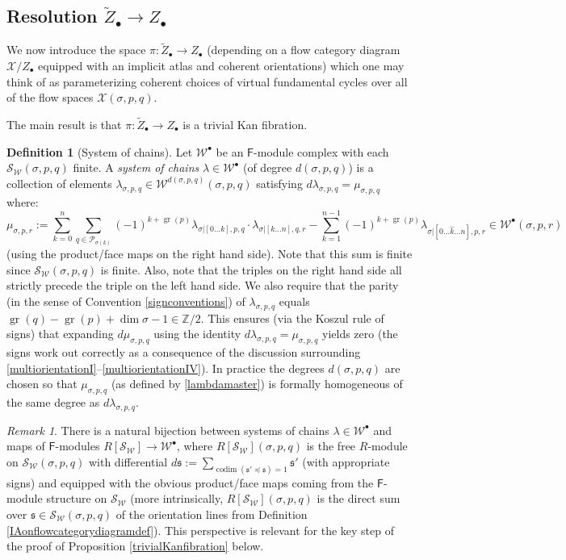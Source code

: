 \documentclass[12pt]{article}
\theoremstyle{definition}
\newtheorem{definition}[theorem]{Definition}
\theoremstyle{remark}
\newtheorem{remark}[theorem]{Remark}
\numberwithin{equation}{subsection}
\newcommand{\W}{\mathcal W}
\newcommand{\s}{\mathfrak s}
\newcommand{\X}{\mathcal X}
\newcommand{\ZZ}{\mathbb Z}
\newcommand{\PPP}{\mathcal P}
\newcommand{\SSS}{\mathcal S}
\newcommand{\codim}{\operatorname{codim}}
\newcommand{\sF}{\mathsf{F}}
\newcommand{\gr}{\operatorname{gr}}
\begin{document}
\subsection{Resolution \texorpdfstring{$\tilde Z_\bullet\to Z_\bullet$}{tilde Z to Z}}

We now introduce the space $\pi:\tilde Z_\bullet\to Z_\bullet$ (depending on a flow category diagram $\X/Z_\bullet$ equipped with an implicit atlas and coherent orientations) which one may think of as parameterizing coherent choices of virtual fundamental cycles over all of the flow spaces $\X(\sigma,p,q)$.

The main result is that $\pi:\tilde Z_\bullet\to Z_\bullet$ is a trivial Kan fibration.

\begin{definition}[System of chains]\label{systemofcycles}
Let $\W^\bullet$ be an $\sF$-module complex with each $\SSS_\W(\sigma,p,q)$ finite.  A \emph{system of chains} $\lambda\in\W^\bullet$ (of degree $d(\sigma,p,q)$) is a collection of elements $\lambda_{\sigma,p,q}\in\W^{d(\sigma,p,q)}(\sigma,p,q)$ satisfying $d\lambda_{\sigma,p,q}=\mu_{\sigma,p,q}$ where:
\begin{equation}\label{lambdamaster}
\mu_{\sigma,p,r}:=\sum_{k=0}^n\sum_{q\in\PPP_{\sigma(k)}}(-1)^{k+\gr(p)}\lambda_{\sigma|[0\ldots k],p,q}\cdot\lambda_{\sigma|[k\ldots n],q,r}-\sum_{k=1}^{n-1}(-1)^{k+\gr(p)}\lambda_{\sigma|[0\ldots\hat k\ldots n],p,r}\in\W^\bullet(\sigma,p,r)
\end{equation}
(using the product/face maps on the right hand side).  Note that this sum is finite since $\SSS_\W(\sigma,p,q)$ is finite.  Also, note that the triples on the right hand side all strictly precede the triple on the left hand side.  We also require that the parity (in the sense of Convention \ref{signconventions}) of $\lambda_{\sigma,p,q}$ equals $\gr(q)-\gr(p)+\dim\sigma-1\in\ZZ/2$.  This ensures (via the Koszul rule of signs) that expanding $d\mu_{\sigma,p,q}$ using the identity $d\lambda_{\sigma,p,q}=\mu_{\sigma,p,q}$ yields zero (the signs work out correctly as a consequence of the discussion surrounding \eqref{multiorientationI}--\eqref{multiorientationIV}).  In practice the degrees $d(\sigma,p,q)$ are chosen so that $\mu_{\sigma,p,q}$ (as defined by \eqref{lambdamaster}) is formally homogeneous of the same degree as $d\lambda_{\sigma,p,q}$.
\end{definition}

\begin{remark}
There is a natural bijection between systems of chains $\lambda\in\W^\bullet$ and maps of $\sF$-modules $R[\SSS_\W]\to\W^\bullet$, where $R[\SSS_\W](\sigma,p,q)$ is the free $R$-module on $\SSS_\W(\sigma,p,q)$ with differential $d\s:=\sum_{\codim(\s'\preceq\s)=1}\s'$ (with appropriate signs) and equipped with the obvious product/face maps coming from the $\sF$-module structure on $\SSS_\W$ (more intrinsically, $R[\SSS_\W](\sigma,p,q)$ is the direct sum over $\s\in\SSS_\W(\sigma,p,q)$ of the orientation lines from Definition \ref{IAonflowcategorydiagramdef}).  This perspective is relevant for the key step of the proof of Proposition \ref{trivialKanfibration} below.
\end{remark}
\end{document}

